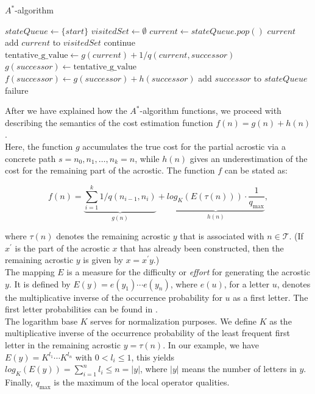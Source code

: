 \documentclass[11pt]{reportAlternative}
\begin{document}
\newpage
\begin{algorithm}
\caption{$A^*$-algorithm}\label{AstarAlgo}
\begin{algorithmic}[1]
\State $stateQueue\gets \{start\}$
\State $visitedSet\gets \emptyset$
\State $current\gets stateQueue.pop()$
\State \Return $current$ 
\EndIf
\State add $current$ to $visitedSet$
			 \State continue
		\EndIf		
		\State
		\State $\textrm{tentative\_g\_value} \gets g(current) + 1/q(current,successor)$		
		\State
			\State $g(successor)\gets \mathrm{tentative\_g\_value}$
			\State $f(successor)\gets g(successor) + h(successor)$
				\State add $successor$ to $stateQueue$
			\EndIf
		\EndIf
	\EndFor			
\EndWhile			 
\Return failure
\EndFunction
\end{algorithmic}
\end{algorithm}


After we have explained how the $A^*$-algorithm functions, we proceed with describing the semantics of the cost estimation function $f(n)=g(n) + h(n)$.\\
Here, the function $g$ accumulates the true cost for the partial acrostic via a concrete path $s=n_0,n_1,\dots,n_k=n$, while $h(n)$ gives an underestimation of the cost for the remaining part of the acrostic. The function $f$ can be stated as:
  
\begin{displaymath}
f(n)= \underbrace{\sum_{i=1}^k 1/q(n_{i-1},n_i)}_{g(n)} + 
\underbrace{log_K(E(\tau(n)))\cdot \frac{1}{q_{\mathrm{max}}}}_{h(n)},
\end{displaymath} 

where $\tau(n)$ denotes the remaining acrostic $y$ that is associated with $n\in\mathcal{T}$. (If $x^{\prime}$ is the part of the acrostic $x$ that has already been constructed, then the remaining acrostic $y$ is given by $x=x^{\prime}y$.)\\
The mapping $E$ is a measure for the difficulty or \emph{effort} for generating the acrostic $y$. It is defined by $E(y) = e(y_1)\cdots e(y_n)$, where $e(u)$, for a letter $u$, denotes the multiplicative inverse of the occurrence probability for $u$ as a first letter. The first letter probabilities can be found in \cite{FirstLetterFrequencies}.\\
The logarithm base $K$ serves for normalization purposes. We define $K$ as the multiplicative inverse of the occurrence probability of the least frequent first letter in the remaining acrostic $y=\tau(n)$. In our example, we have $E(y)=K^{l_1}\cdots K^{l_n}$ with $0<l_i\leq 1$, this yields $log_K(E(y))=\sum_{i=1}^n l_i \leq n =|y|$, where $|y|$ means the number of letters in $y$.\\
Finally, $q_{\mathrm{max}}$ is the maximum of the local operator qualities. \\
\end{document}
